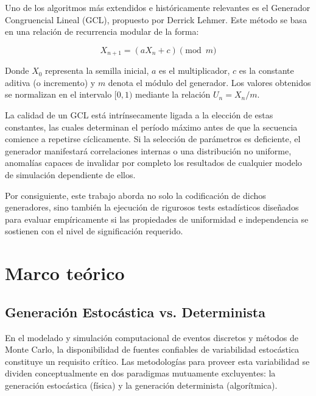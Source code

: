 \documentclass{article}
\begin{document}
Uno de los algoritmos más extendidos e históricamente relevantes es el Generador Congruencial Lineal (GCL), propuesto por Derrick Lehmer. Este método se basa en una relación de recurrencia modular de la forma:

\begin{equation}
X_{n+1} = (aX_n + c) \pmod m
\end{equation}

Donde $X_0$ representa la semilla inicial, $a$ es el multiplicador, $c$ es la constante aditiva (o incremento) y $m$ denota el módulo del generador. Los valores obtenidos se normalizan en el intervalo $[0, 1)$ mediante la relación $U_n = X_n / m$. 

La calidad de un GCL está intrínsecamente ligada a la elección de estas constantes, las cuales determinan el período máximo antes de que la secuencia comience a repetirse cíclicamente. Si la selección de parámetros es deficiente, el generador manifestará correlaciones internas o una distribución no uniforme, anomalías capaces de invalidar por completo los resultados de cualquier modelo de simulación dependiente de ellos. 

Por consiguiente, este trabajo aborda no solo la codificación de dichos generadores, sino también la ejecución de rigurosos tests estadísticos diseñados para evaluar empíricamente si las propiedades de uniformidad e independencia se sostienen con el nivel de significación requerido.

\newpage

\section{Marco teórico}

\subsection{Generación Estocástica vs. Determinista}
En el modelado y simulación computacional de eventos discretos y métodos de Monte Carlo, la disponibilidad de fuentes confiables de variabilidad estocástica constituye un requisito crítico. Las metodologías para proveer esta variabilidad se dividen conceptualmente en dos paradigmas mutuamente excluyentes: la generación estocástica (física) y la generación determinista (algorítmica).
\end{document}
